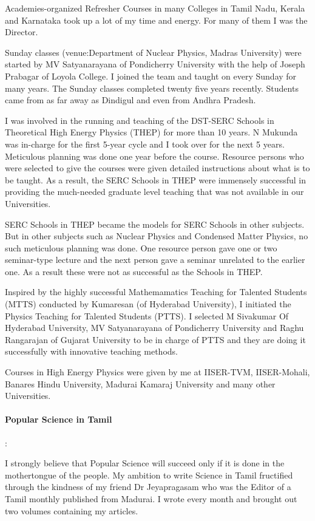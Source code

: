 Academies-organized Refresher Courses in many Colleges in
Tamil Nadu, Kerala and Karnataka took up a lot of my time and
energy. For many of them I was the Director.

Sunday classes (venue:Department of Nuclear Physics, Madras University) 
were started by MV Satyanarayana of Pondicherry University with the 
help of Joseph Prabagar of Loyola College. I joined the team and taught 
on every Sunday for many years. The Sunday classes completed twenty 
five years recently. Students came from as far away as Dindigul and 
even from Andhra Pradesh.

I was involved in the running and teaching of the DST-SERC
Schools in Theoretical High Energy Physics (THEP) for more
than 10 years. N Mukunda was in-charge for the first 5-year
cycle and I took over for the next 5 years. Meticulous planning
was done one year before the course. Resource persons who were
selected to give the courses were given detailed instructions
about what is to be taught. As a result, the SERC Schools in
THEP were immensely successful in providing the much-needed
graduate level teaching that was not available in our Universities.

SERC Schools in THEP became the models for SERC Schools in other
subjects. But in other subjects such as Nuclear Physics and
Condensed Matter Physics, no such meticulous planning was done.
One resource person gave one or two seminar-type lecture and the
next person gave a seminar unrelated to the earlier one. As a result
these were not as successful as the Schools in THEP.

Inspired by the highly successful Mathemamatics Teaching for Talented 
Students (MTTS) conducted by Kumaresan (of Hyderabad University), I 
initiated the Physics Teaching for Talented Students (PTTS). I selected 
M Sivakumar Of Hyderabad University, MV Satyanarayana of Pondicherry 
University and Raghu Rangarajan of Gujarat University to be in charge 
of PTTS and they are doing it successfully with innovative teaching 
methods.

Courses in High Energy Physics were given by me at IISER-TVM, 
IISER-Mohali, Banares Hindu University, Madurai Kamaraj University and 
many other Universities.

\paragraph{Popular Science in Tamil}:

I strongly believe that Popular Science will succeed only if it is done 
in the mothertongue of the people. My ambition to write Science in Tamil 
fructified through the kindness of my friend Dr Jeyapragasam who was the 
Editor of a Tamil monthly published from Madurai. I wrote every month 
and brought out two volumes containing my articles.

